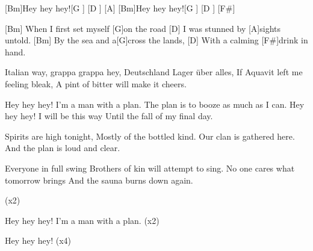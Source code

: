 

\begin{guitar}
	
	[Bm]Hey hey hey![G ] [D ] [A]{}
	[Bm]Hey hey hey![G ] [D ] [F#]{}
	
	[Bm] When I first set myself [G]on the road
	[D] I was stunned by [A]sights untold.
	[Bm] By the sea and a[G]cross the lands,
	[D] With a calming [F#]drink in hand.
	
	Italian way, grappa grappa hey,
	Deutschland Lager über alles,
	If Aquavit left me feeling bleak,
	A pint of bitter will make it cheers.
	
	\begin{highlightbar}
		Hey hey hey! I'm a man with a plan.
		The plan is to booze as much as I can.
		Hey hey hey! I will be this way
		Until the fall of my final day.%
	\end{highlightbar}
	
	\songsection{Instrumental}
	
	\songsection{Verse 2}
	Spirits are high tonight,
	Mostly of the bottled kind.
	Our clan is gathered here.
	And the plan is loud and clear.
	
	Everyone in full swing
	Brothers of kin will attempt to sing.
	No one cares what tomorrow brings
	And the sauna burns down again.
	
	\begin{highlightbar}
		  (x2)%
	\end{highlightbar}
	
	Hey hey hey! I'm a man with a plan. (x2)
	
	Hey hey hey! (x4)
\end{guitar}